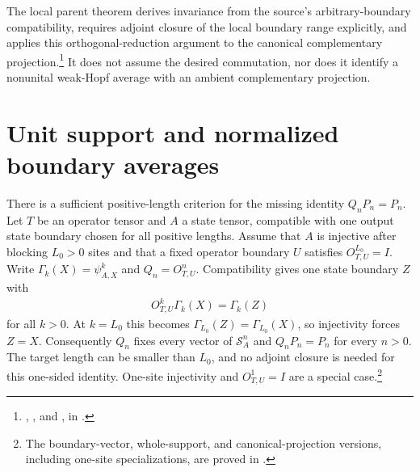 \documentclass{article}
\begin{document}
The local parent theorem derives invariance from the source's
arbitrary-boundary compatibility, requires adjoint closure of the
local boundary range explicitly, and applies this orthogonal-reduction
argument to the canonical complementary projection.\footnote{
    ,
    ,
    and
    ,
    in .}
It does not assume the desired commutation, nor does it identify a
nonunital weak-Hopf average with an ambient complementary projection.

\section[Unit support and normalized boundary averages]
 {Unit support and normalized\\boundary averages}
There is a sufficient positive-length criterion for the missing identity
$Q_nP_n=P_n$. Let $T$ be an operator tensor and $A$ a state tensor,
compatible with one output state boundary chosen for all positive lengths.
Assume that $A$ is injective after blocking $L_0>0$ sites and that a fixed
operator boundary $U$ satisfies $O^{L_0}_{T,U}=I$. Write
$\Gamma_k(X)=\psi^k_{A,X}$ and $Q_n=O^n_{T,U}$. Compatibility gives
one state boundary $Z$ with
\begin{align}
    O^k_{T,U}\Gamma_k(X)=\Gamma_k(Z)
    \label{eq:glm23_wha_parent_unit_compatibility}
\end{align}
for all $k>0$. At $k=L_0$ this becomes
$\Gamma_{L_0}(Z)=\Gamma_{L_0}(X)$, so injectivity forces $Z=X$.
Consequently $Q_n$ fixes every vector of $\mathcal S_A^n$ and
$Q_nP_n=P_n$ for every $n>0$. The target length can be smaller than
$L_0$, and no adjoint closure is needed for this one-sided identity.
One-site injectivity and $O^1_{T,U}=I$ are a special case.\footnote{
    The boundary-vector, whole-support, and canonical-projection versions,
    including one-site specializations, are proved in
    .}
\end{document}
